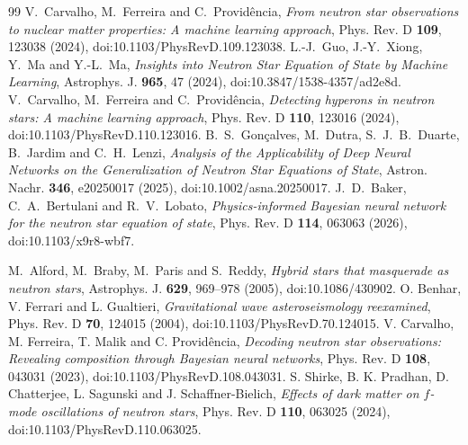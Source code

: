 \documentclass[11pt,a4paper]{article}
\begin{document}
\begin{thebibliography}{99}\small
{} V.~Carvalho, M.~Ferreira and C.~Provid\^encia, \emph{From neutron star observations to nuclear matter properties: A machine learning approach}, Phys. Rev. D \textbf{109}, 123038 (2024), doi:10.1103/PhysRevD.109.123038.
 L.-J.~Guo, J.-Y.~Xiong, Y.~Ma and Y.-L.~Ma, \emph{Insights into Neutron Star Equation of State by Machine Learning}, Astrophys. J. \textbf{965}, 47 (2024), doi:10.3847/1538-4357/ad2e8d.
 V.~Carvalho, M.~Ferreira and C.~Provid\^encia, \emph{Detecting hyperons in neutron stars: A machine learning approach}, Phys. Rev. D \textbf{110}, 123016 (2024), doi:10.1103/PhysRevD.110.123016.
 B.~S.~Gon\c{c}alves, M.~Dutra, S.~J.~B.~Duarte, B.~Jardim and C.~H.~Lenzi, \emph{Analysis of the Applicability of Deep Neural Networks on the Generalization of Neutron Star Equations of State}, Astron. Nachr. \textbf{346}, e20250017 (2025), doi:10.1002/asna.20250017.
 J.~D.~Baker, C.~A.~Bertulani and R.~V.~Lobato, \emph{Physics-informed Bayesian neural network for the neutron star equation of state}, Phys. Rev. D \textbf{114}, 063063 (2026), doi:10.1103/x9r8-wbf7.

 M.~Alford, M.~Braby, M.~Paris and S.~Reddy, \emph{Hybrid stars that masquerade as neutron stars}, Astrophys. J. \textbf{629}, 969--978 (2005), doi:10.1086/430902.
 O. Benhar, V. Ferrari and L. Gualtieri, \emph{Gravitational wave asteroseismology reexamined}, Phys. Rev. D \textbf{70}, 124015 (2004), doi:10.1103/PhysRevD.70.124015.
 V. Carvalho, M. Ferreira, T. Malik and C. Provid\^encia, \emph{Decoding neutron star observations: Revealing composition through Bayesian neural networks}, Phys. Rev. D \textbf{108}, 043031 (2023), doi:10.1103/PhysRevD.108.043031.
 S. Shirke, B. K. Pradhan, D. Chatterjee, L. Sagunski and J. Schaffner-Bielich, \emph{Effects of dark matter on $f$-mode oscillations of neutron stars}, Phys. Rev. D \textbf{110}, 063025 (2024), doi:10.1103/PhysRevD.110.063025.


\end{thebibliography}
\end{document}
